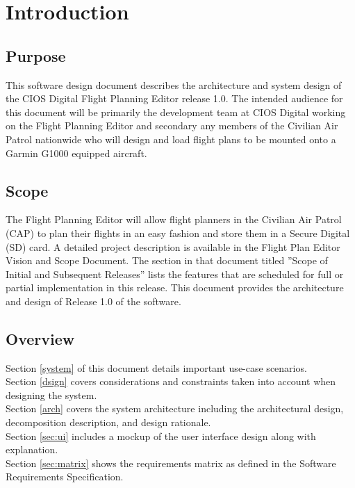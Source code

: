 \documentclass[12pt, letterpaper]{article}
\begin{document}
\newpage
\tableofcontents
\newpage

\pagestyle{style1}
\setcounter{page}{1}

\section{Introduction}
  \subsection{Purpose}
    This software design document describes the architecture and system design of the CIOS Digital Flight Planning Editor release 1.0.
    The intended audience for this document will be primarily the development team at CIOS Digital working on the Flight Planning Editor and secondary any members of the Civilian Air Patrol nationwide who will design and load flight plans to be mounted onto a Garmin G1000 equipped aircraft.

  \subsection{Scope}
    The Flight Planning Editor will allow flight planners in the Civilian Air Patrol (CAP) to plan their flights in an easy fashion and store them in a Secure Digital (SD) card. A detailed project description is available in the Flight Plan Editor Vision and Scope Document. The section in that document titled ”Scope of Initial and Subsequent Releases” lists the features that are scheduled for full or partial implementation in this release.
    This document provides the architecture and design of Release 1.0 of the software.

   \subsection{Overview}
     Section \ref{system} of this document details important use-case scenarios. \\
     Section \ref{dsign} covers considerations and constraints taken into account when designing the system.\\
     Section \ref{arch} covers the system architecture including the architectural design, decomposition description, and design rationale. \\
     Section \ref{sec:ui} includes a mockup of the user interface design along with explanation. \\
     Section \ref{sec:matrix} shows the requirements matrix as defined in the Software Requirements Specification.\\
\end{document}
